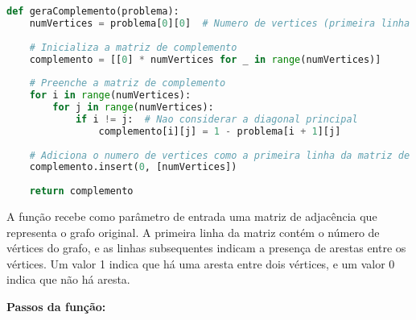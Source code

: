 \documentclass[12pt]{article}
\begin{document}
\begin{lstlisting}[caption={Função que gera o complemento do grafo para o problema do conjunto independente},label={lst:cod1},language=Python]
def geraComplemento(problema):
    numVertices = problema[0][0]  # Numero de vertices (primeira linha da matriz)
    
    # Inicializa a matriz de complemento
    complemento = [[0] * numVertices for _ in range(numVertices)]
    
    # Preenche a matriz de complemento
    for i in range(numVertices):
        for j in range(numVertices):
            if i != j:  # Nao considerar a diagonal principal
                complemento[i][j] = 1 - problema[i + 1][j]
    
    # Adiciona o numero de vertices como a primeira linha da matriz de complemento
    complemento.insert(0, [numVertices])
    
    return complemento
 \end{lstlisting}
    A função recebe como parâmetro de entrada uma matriz de adjacência que representa o grafo original. A primeira linha da matriz contém o número de vértices do grafo, e as linhas subsequentes indicam a presença de arestas entre os vértices. Um valor 1 indica que há uma aresta entre dois vértices, e um valor 0 indica que não há aresta.
    \par \textbf{Passos da função: }
\end{document}
